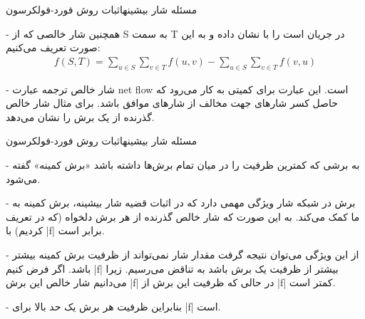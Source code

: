 \begin{itemframe}{مسئله شار بیشینه}{اثبات روش فورد-فولکرسون}
\item[-]
همچنین شار خالصی
 که از S به سمت T در جریان است را با
نشان داده و به این صورت تعریف می‌کنیم:
\begin{align}
f(S, T) = \sum_{u \in S}  \sum_{v \in T} f(u, v)  - \sum_{u \in S}  \sum_{v \in T} f(v, u)
\label{cut-net-flow}
\end{align}
\item[-]
شار خالص ترجمه عبارت net flow است. این عبارت برای کمیتی به کار می‌رود که حاصل کسر شارهای جهت مخالف از شارهای موافق باشد. برای مثال  شار خالص گذرنده از یک برش را نشان می‌دهد.
\end{itemframe}

\begin{itemframe}{مسئله شار بیشینه}{اثبات روش فورد-فولکرسون}
\item[-]
به برشی که کمترین ظرفیت را در میان تمام برش‌ها داشته باشد «برش کمینه»
 گفته می‌شود.
\item[-]
برش در شبکه شار ویژگی مهمی دارد که در اثبات قضیه شار بیشینه، برش کمینه به ما کمک می‌کند. به این صورت که شار خالص گذرنده از هر برش دلخواه (که در  تعریف کردیم) با |f| برابر است.

\item[-]
از این ویژگی می‌توان نتیجه گرفت مقدار شار نمی‌تواند از ظرفیت برش کمینه بیشتر باشد. اگر فرض کنیم |f| بیشتر از ظرفیت یک برش باشد به تناقض می‌رسیم. زیرا می‌دانیم شار خالص این برش |f| در  حالی که ظرفیت این برش از |f| کمتر است.
\item[-]
بنابراین ظرفیت هر برش یک حد بالا برای |f| است.
\end{itemframe}

